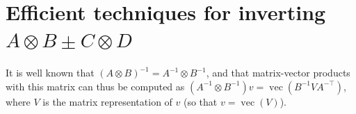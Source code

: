 \documentclass[12pt]{article}
\newcommand{\expected}{\operatorname{E}}
\newcommand{\ovec}{\operatorname{vec}}
\newcommand{\deriv}{\mathcal{D}}
\newcommand{\derivfrac}[2]{\frac{\mathrm{d}#1}{\mathrm{d}#2}}
\begin{document}
%
%
%
%



\section{Efficient techniques for inverting $A \otimes B \pm C \otimes D$}
\label{sec:stein_solve}

It is well known that $(A \otimes B)^{-1} = A^{-1} \otimes B^{-1}$, and that matrix-vector products with this matrix can thus be computed as $(A^{-1} \otimes B^{-1}) v = \ovec( B^{-1} V A^{-\top} )$, where $V$ is the matrix representation of $v$ (so that $v = \ovec(V)$).
\end{document}
